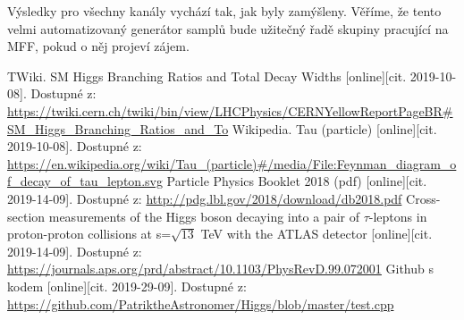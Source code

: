 \documentclass{article}
\begin{document}
Výsledky pro všechny kanály vychází tak, jak byly zamýšleny. Věříme, že tento velmi automatizovaný generátor samplů bude užitečný řadě skupiny pracující na MFF, pokud o něj projeví zájem.
\renewcommand\refname{Použitá literatura}
\begin{thebibliography}{}
TWiki. SM Higgs Branching Ratios and Total Decay Widths [online][cit. 2019-10-08]. Dostupné z:
\url{https://twiki.cern.ch/twiki/bin/view/LHCPhysics/CERNYellowReportPageBR#SM_Higgs_Branching_Ratios_and_To}
Wikipedia. Tau (particle) [online][cit. 2019-10-08]. Dostupné z:
\url{https://en.wikipedia.org/wiki/Tau_(particle)#/media/File:Feynman_diagram_of_decay_of_tau_lepton.svg}
Particle Physics Booklet 2018 (pdf) [online][cit. 2019-14-09]. Dostupné z:
\url{http://pdg.lbl.gov/2018/download/db2018.pdf}
Cross-section measurements of the Higgs boson decaying into a pair of $\tau$-leptons in proton-proton collisions at s=$\sqrt{13}$ TeV with the ATLAS detector [online][cit. 2019-14-09]. Dostupné z:
\url{https://journals.aps.org/prd/abstract/10.1103/PhysRevD.99.072001}
Github s kodem [online][cit. 2019-29-09]. Dostupné z:
\url{https://github.com/PatriktheAstronomer/Higgs/blob/master/test.cpp}
\end{thebibliography}
\end{document}
